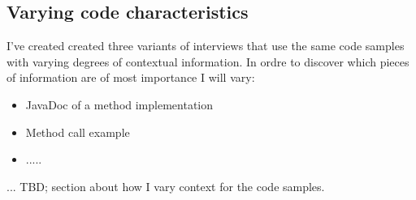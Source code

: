 \subsection{Varying code characteristics}
I've created created three variants of interviews that use the same code samples with varying degrees of contextual information. In ordre to discover which pieces of information are of most importance I will vary:

\begin{itemize}
\item JavaDoc of a method implementation
\item Method call example
\item .....
\end{itemize}

... TBD; section about how I vary context for the code samples.